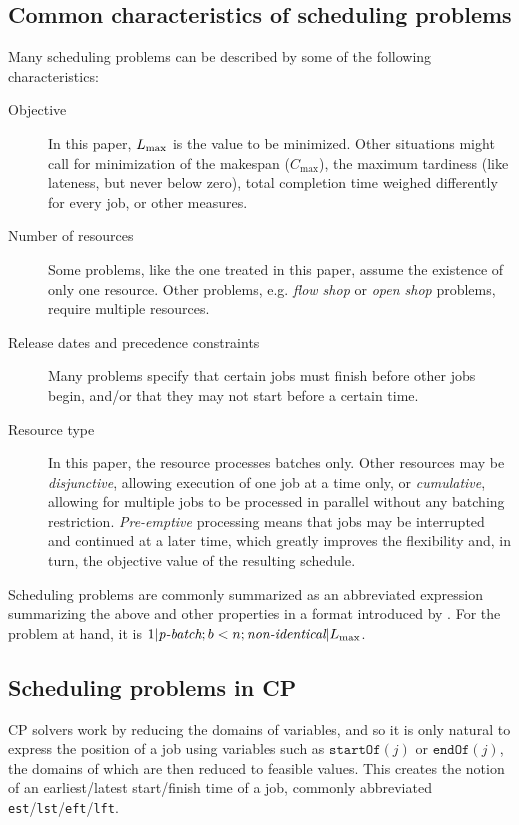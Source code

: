 \documentclass[13pt, letterpaper, oneside]{book}
\begin{document}
\subsection{Common characteristics of scheduling problems}
Many scheduling problems can be described by some of the following
characteristics:
\begin{description}
\item[Objective]{In this paper, $L_{\text{max}}$ is the value to be minimized. Other
situations might call for minimization of the makespan ($C_\text{max}$), the
maximum tardiness (like lateness, but never below zero), total completion time
weighed differently for every job, or other measures.}
\item[Number of resources]{Some problems, like the one treated in this paper,
assume the existence of only one resource. Other problems, e.g. \textit{flow
shop} or \textit{open shop} problems, require multiple resources.}
\item[Release dates and precedence constraints]{Many problems specify that
certain jobs must finish before other jobs begin, and/or that they may not start
before a certain time.}
\item[Resource type]{In this paper, the resource processes batches only. Other
resources may be \textit{disjunctive}, allowing execution of one job at a time
only, or \textit{cumulative}, allowing for multiple jobs to be processed in
parallel without any batching restriction. \textit{Pre-emptive} processing means
that jobs may be interrupted and continued at a later time, which greatly
improves the flexibility and, in turn, the objective value of the resulting
schedule.}
\end{description}

Scheduling problems are commonly summarized as an abbreviated expression
summarizing the above and other properties in a format introduced by
\citet{graham}. For the problem at hand, it is $1|\textit{p-batch}; b < n;
\textit{non-identical}|L_{\text{max}}$.

\subsection{Scheduling problems in CP}
\label{sec:schedulingcp}
CP solvers work by reducing the domains of variables, and so it is only natural
to express the position of a job using variables such as $\mathtt{startOf}(j)$
or $\mathtt{endOf}(j)$, the domains of which are then reduced to feasible
values. This creates the notion of an earliest/latest start/finish time of a job,
commonly abbreviated \texttt{est}/\texttt{lst}/\texttt{eft}/\texttt{lft}.
\end{document}
